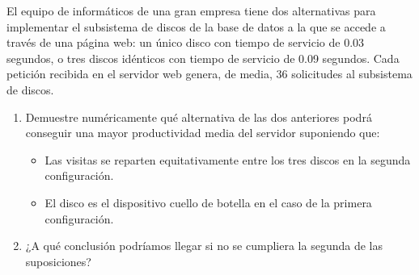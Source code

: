 \begin{ejercicio}\label{ej:5.15}
    El equipo de informáticos de una gran empresa tiene dos alternativas para implementar el subsistema de discos de la base de datos a la que se accede a través de una página web: un único disco con tiempo de servicio de 0.03 segundos, o tres discos idénticos con tiempo de servicio de 0.09 segundos. Cada petición recibida en el servidor web genera, de media, 36 solicitudes al subsistema de discos.
    \begin{enumerate}
        \item Demuestre numéricamente qué alternativa de las dos anteriores podrá conseguir una mayor productividad media del servidor suponiendo que:
        \begin{itemize}
            \item Las visitas se reparten equitativamente entre los tres discos en la segunda configuración.
            \item El disco es el dispositivo cuello de botella en el caso de la primera configuración.
        \end{itemize}
        \item ¿A qué conclusión podríamos llegar si no se cumpliera la segunda de las suposiciones?
    \end{enumerate}
\end{ejercicio}
\begin{comment}
\solucion
    \begin{enumerate}
        \item En el primer caso la demanda del disco es $36 \times 0.03 = 1.08$ segundos; en el segundo, la demanda de cualquiera de los tres discos es $12 \times 0.09 = 1.08$ segundos. Como ningún otro dispositivo tiene una demanda de servicio mayor (ya que el resto de dispositivos es idéntico en ambas configuraciones) también los discos son los cuellos de botella en la segunda configuración. Por tanto, en ambos casos la productividad máxima del servidor viene determinada por la inversa de la demanda de servicio de los discos, es decir, $0.93$ tr/s. Por tanto, las dos opciones ofrecen la misma productividad máxima.
        \item En ese caso, otro dispositivo sería el cuello de botella, pero sería exactamente el mismo dispositivo en ambas configuraciones por lo que, nuevamente, las dos opciones ofrecerían la misma productividad máxima.
    \end{enumerate}
\end{comment}

